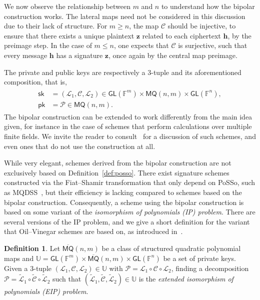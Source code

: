 \documentclass[12pt, a4paper, oneside]{memoir}
\theoremstyle{definition}
\newtheorem{definition}[theorem]{Definition}
\begin{document}
We now observe the relationship between $m$ and $n$ to understand how the bipolar construction works. The lateral maps need not be considered in this discussion due to their lack of structure. For $m \geq n$, the map $\mathcal{C}$ should be injective, to ensure that there exists a unique plaintext $\mathbf{z}$ related to each ciphertext $\mathbf{h}$, by the preimage step. In the case of $m \leq n$, one expects that $\mathcal{C}$ is surjective, such that every message $\mathbf{h}$ has a signature $\mathbf{z}$, once again by the central map preimage.

The private and public keys are respectively a $3$-tuple and its aforementioned composition, that is,
\begin{align}
  \begin{split}
    \mathsf{sk} &= (\mathcal{L}_{1}, \mathcal{C}, \mathcal{L}_{2})
      \in \mathsf{GL}(\mathbb{F}^{m}) \times \mathsf{MQ}(n, m) \times \mathsf{GL}(\mathbb{F}^{n}), \\
    \mathsf{pk} &= \mathcal{P} \in \mathsf{MQ}(n, m).
  \end{split}
\end{align}
The bipolar construction can be extended to work differently from the main idea given, for instance in the case of schemes that perform calculations over multiple finite fields. We invite the reader to consult~\cite[Sec.~2.2]{Petzoldt:201307} for a discussion of such schemes, and even ones that do not use the construction at all.

While very elegant, schemes derived from the bipolar construction are not exclusively based on Definition~\ref{def:posso}. There exist signature schemes constructed via the Fiat--Shamir transformation that only depend on \textsf{PoSSo}, such as MQDSS~\cite{Chen:201612}, but their efficiency is lacking compared to schemes based on the bipolar construction. Consequently, a scheme using the bipolar construction is based on some variant of the \emph{isomorphism of polynomials (IP) problem}. There are several versions of the IP problem, and we give a short definition for the variant that Oil--Vinegar schemes are based on, as introduced in~\cite{Ding:200806}.

\begin{definition}\label{def:eip}
  Let $\overline{\mathsf{MQ}}(n, m)$ be a class of structured quadratic polynomial maps and $\mathbb{U} = \mathsf{GL}(\mathbb{F}^{m}) \times \overline{\mathsf{MQ}}(n, m) \times \mathsf{GL}(\mathbb{F}^{n})$ be a set of private keys. Given a $3$-tuple $(\mathcal{L}_{1}, \mathcal{C}, \mathcal{L}_{2}) \in \mathbb{U}$ with $\mathcal{P} = \mathcal{L}_{1} \circ \mathcal{C} \circ \mathcal{L}_{2}$, finding a decomposition $\mathcal{P} = \widetilde{\mathcal{L}}_{1} \circ \widetilde{\mathcal{C}} \circ \widetilde{\mathcal{L}}_{2}$ such that $(\widetilde{\mathcal{L}}_{1}, \widetilde{\mathcal{C}}, \widetilde{\mathcal{L}}_{2}) \in \mathbb{U}$ is the \emph{extended isomorphism of polynomials (EIP) problem}.
\end{definition}
\end{document}
